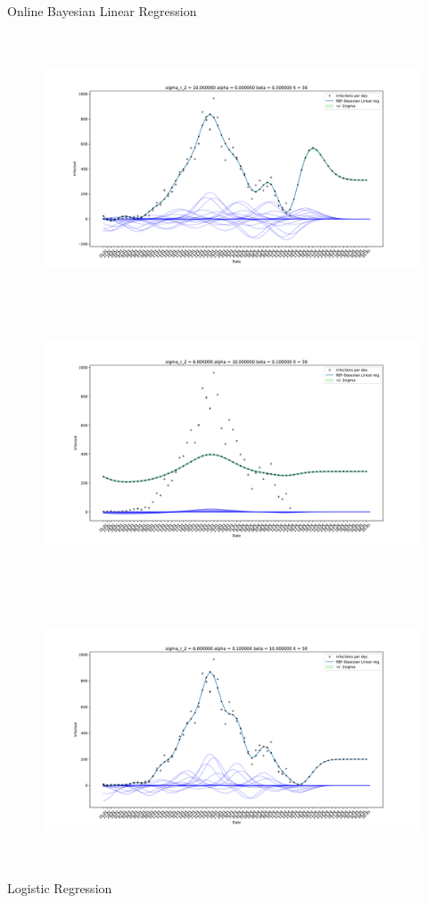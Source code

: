 \documentclass[english]{exercisesheet}
\begin{document}
\begin{nexercise}{Online Bayesian Linear Regression}
\begin{solution}
\begin{figure}
        \includegraphics[width=1\textwidth, height=8cm]{11.pdf}
        \includegraphics[width=1\textwidth, height=8cm]{12.pdf}
        \end{figure}
        \cleardoublepage
        \begin{figure}
        \includegraphics[width=1\textwidth, height=8cm]{13.pdf}
        \end{figure}
      \end{solution}
 \end{nexercise}
\cleardoublepage
 \begin{nexercise}{Logistic Regression}
\end{nexercise}
\end{document}
